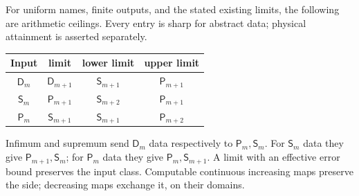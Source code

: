 \begin{proposition}\label{prop:calculus}
For uniform names, finite outputs, and the stated existing limits, the
following are arithmetic ceilings. Every entry is sharp for abstract
data; physical attainment is asserted separately.
\begin{center}\small
\begin{tabular}{c|ccc}
Input & limit & lower limit & upper limit\\\hline
$\mathsf D_m$ & $\mathsf D_{m+1}$ & $\mathsf S_{m+1}$ & $\mathsf P_{m+1}$\\
$\mathsf S_m$ & $\mathsf P_{m+1}$ & $\mathsf S_{m+2}$ & $\mathsf P_{m+1}$\\
$\mathsf P_m$ & $\mathsf S_{m+1}$ & $\mathsf S_{m+1}$ & $\mathsf P_{m+2}$
\end{tabular}
\end{center}
Infimum and supremum send $\mathsf D_m$ data respectively to
$\mathsf P_m,\mathsf S_m$. For $\mathsf S_m$ data they give
$\mathsf P_{m+1},\mathsf S_m$; for $\mathsf P_m$ data they give
$\mathsf P_m,\mathsf S_{m+1}$. A limit with an effective error bound
preserves the input class. Computable continuous increasing maps
preserve the side; decreasing maps exchange it, on their domains.
\end{proposition}
